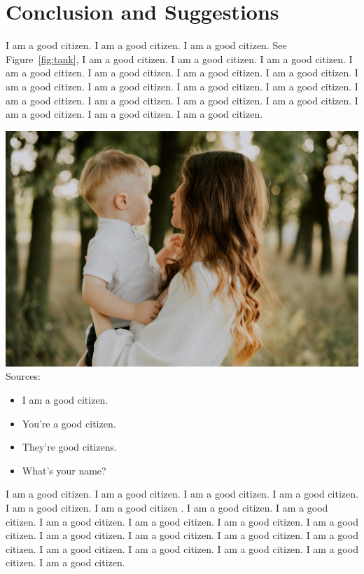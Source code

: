 \documentclass[12pt]{article}
\begin{document}
\section{Conclusion and Suggestions}

I am a good citizen. I am a good citizen. I am a good citizen.
See Figure~\ref{fig:tank},
I am a good citizen. I am a good citizen. I am a good citizen.
I am a good citizen. I am a good citizen. I am a good citizen.
I am a good citizen. I am a good citizen. I am a good citizen.
I am a good citizen. I am a good citizen. I am a good citizen.
I am a good citizen. I am a good citizen. I am a good citizen.
I am a good citizen. I am a good citizen. I am a good citizen.

{\includegraphics[width=.5\linewidth]{katerREDU.jpg}}
{Sources: }


\begin{itemize}
\item
I am a good citizen.
\item
You're a good citizen.
\item
They're good citizens.
\item
What's your name?
\end{itemize}

I am a good citizen. I am a good citizen. I am a good citizen.
I am a good citizen. I am a good citizen. I am a good citizen \autocite{ter1971}.
I am a good citizen. I am a good citizen. I am a good citizen.
I am a good citizen. I am a good citizen. I am a good citizen.
I am a good citizen. I am a good citizen. I am a good citizen.
I am a good citizen. I am a good citizen. I am a good citizen.
I am a good citizen. I am a good citizen. I am a good citizen.


\printbibliography
\end{document}
